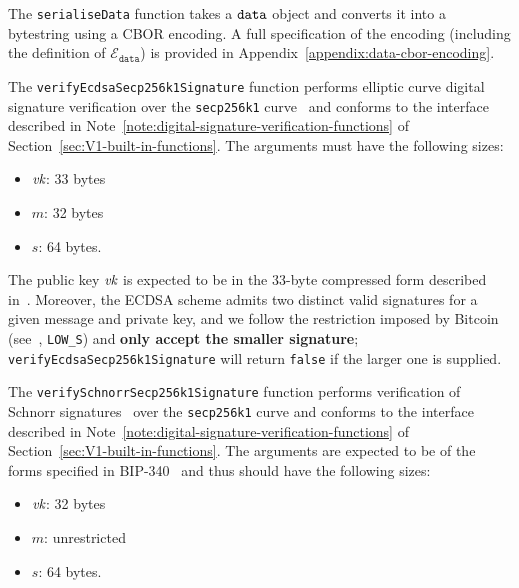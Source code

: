 \label{note:serialise-data}
The \texttt{serialiseData} function takes a $\mathtt{data}$ object and converts it
into a bytestring using a CBOR encoding.  A full specification of the encoding
(including the definition of $\mathcal{E}_{\mathtt{data}}$) is provided in
Appendix~\ref{appendix:data-cbor-encoding}.


\label{note:verify-ecdsa-secp256k1-signature}
The \texttt{verifyEcdsaSecp256k1Signature} function performs elliptic curve
digital signature verification \cite{ANSI-X9.62, ANSI-x9.142,
  Johnson-Menezes-Vanstone-ECDSA} over the \texttt{secp256k1}
curve~\cite[\S2.4.1]{SECP256} and conforms to the interface described in
Note~\ref{note:digital-signature-verification-functions} of
Section~\ref{sec:V1-built-in-functions}.  The arguments must have the
following sizes:
\begin{itemize}
\item $\textit{vk}$: 33 bytes
\item $m$: 32 bytes
\item $s$: 64 bytes.
\end{itemize}
The public key $\textit{vk}$ is expected to be in the 33-byte compressed form described
in~\cite{Bitcoin-ECDSA}.  Moreover, the ECDSA scheme admits two distinct valid
signatures for a given message and private key, and  we follow the restriction
imposed by Bitcoin (see~\cite{BIP-146},
\texttt{LOW\_S}) and \textbf{only accept the smaller signature};
\texttt{verifyEcdsa\-Secp\-256k1Signature} will return \texttt{false} if the larger
one is supplied.

%

\label{note:verify-schnorr-secp256k1-signature}
The \texttt{verifySchnorrSecp256k1Signature} function performs verification of
Schnorr signatures~\cite{Schnorr89, BIP-340} over the \texttt{secp256k1} curve
and conforms to the interface described in
Note~\ref{note:digital-signature-verification-functions} of
Section~\ref{sec:V1-built-in-functions}.  The arguments are expected to be
of the forms specified in BIP-340~\cite{BIP-340} and thus should have the
following sizes:
\begin{itemize}
\item $\textit{vk}$: 32 bytes
\item $m$: unrestricted
\item $s$: 64 bytes.
\end{itemize}
